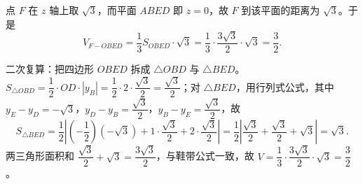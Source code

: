 \begin{answer}
点 $F$ 在 $z$ 轴上取 $\sqrt3$，而平面 $ABED$ 即 $z=0$，故 $F$ 到该平面的距离为 $\sqrt3$。于是
\nopagebreak[4]
\[V_{F-OBED}=\frac13S_{OBED}\cdot\sqrt3=\frac13\cdot\frac{3\sqrt3}{2}\cdot\sqrt3=\frac32.\]

二次复算：把四边形 $OBED$ 拆成 $\triangle OBD$ 与 $\triangle BED$。$S_{\triangle OBD}=\dfrac12\cdot OD\cdot\left|y_B\right|=\dfrac12\cdot2\cdot\dfrac{\sqrt3}{2}=\dfrac{\sqrt3}{2}$；对 $\triangle BED$，用行列式公式，其中 $y_E-y_D=-\sqrt3$，$y_D-y_B=\dfrac{\sqrt3}{2}$，$y_B-y_E=\dfrac{\sqrt3}{2}$，故
\nopagebreak[4]
\[S_{\triangle BED}=\frac12\left|\left(-\frac12\right)(-\sqrt3)+1\cdot\frac{\sqrt3}{2}+2\cdot\frac{\sqrt3}{2}\right|=\frac12\left|\frac{\sqrt3}{2}+\frac{\sqrt3}{2}+\sqrt3\right|=\sqrt3.\]
两三角形面积和 $\dfrac{\sqrt3}{2}+\sqrt3=\dfrac{3\sqrt3}{2}$，与鞋带公式一致，故 $V=\dfrac13\cdot\dfrac{3\sqrt3}{2}\cdot\sqrt3=\dfrac32$。



\end{answer}
